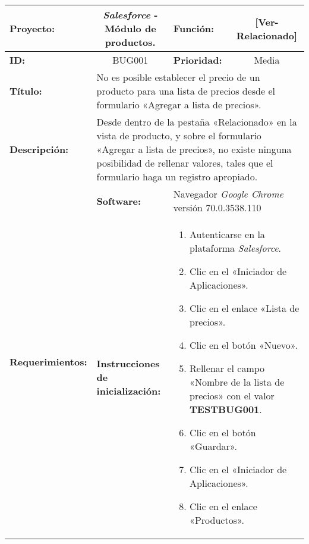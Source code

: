 \begin{table}
\renewcommand{\arraystretch}{1}
\linespread{1}
\centering
\begin{tabular}{|p{2.5cm}|p{2.8cm}|p{2.2cm}|p{2.8cm}|p{2.2cm}|}
\hline
\footnotesize{\textbf{Proyecto:}} &
\multicolumn{2}{c|}{\footnotesize{\emph{Salesforce} - Módulo de productos.}} &
\footnotesize{\textbf{Función:}} &
\multicolumn{1}{c|}{\footnotesize{[Ver-Relacionado]}} \\
\hline
\footnotesize{\textbf{ID:}} & \multicolumn{2}{c|}{\footnotesize{BUG001}} &
\footnotesize{\textbf{Prioridad:}} &
\multicolumn{1}{c|}{\footnotesize{Media}} \\
\hline
\footnotesize{\textbf{Título:}} &
\multicolumn{4}{p{12.4cm}|}{\footnotesize{No es posible establecer el precio de
un producto para una lista de precios desde el formulario «Agregar a lista de
precios».}} \\
\hline
\footnotesize{\textbf{Descripción:}} &
\multicolumn{4}{p{12.4cm}|}{\footnotesize{Desde dentro de la pestaña
«Relacionado» en la vista de producto, y sobre el formulario «Agregar a lista de
precios», no existe ninguna posibilidad de rellenar valores, tales que el
formulario haga un registro apropiado.}} \\
\hline
\multirow{2}{*}{\footnotesize{\textbf{Requerimientos:}}} &
\footnotesize{\textbf{Software:}} &
\multicolumn{3}{p{7.8cm}|}{\footnotesize{Navegador \emph{Google Chrome}
versión 70.0.3538.110}} \\
\cline{2-5}
& \footnotesize{\textbf{Instrucciones de inicialización:}} &
\multicolumn{3}{p{7.8cm}|}{\footnotesize{
\vspace{-3mm}
\begin{enumerate}
\item Autenticarse en la plataforma \emph{Salesforce}.
\item Clic en el «Iniciador de Aplicaciones».
\item Clic en el enlace «Lista de precios».
\item Clic en el botón «Nuevo».
\item Rellenar el campo «Nombre de la lista de precios» con el valor
    \textbf{TESTBUG001}.
\item Clic en el botón «Guardar».
\item Clic en el «Iniciador de Aplicaciones».
\item Clic en el enlace «Productos».
\end{enumerate}
\vspace{-5mm}
}} \\

\end{tabular}
\end{table}
